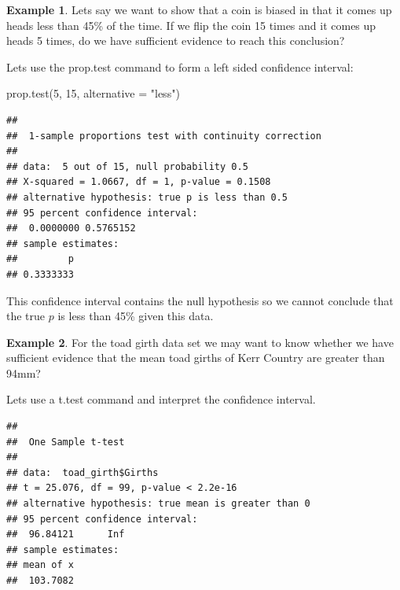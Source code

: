 \documentclass[
]{book}
\newenvironment{Shaded}{\begin{snugshade}}{\end{snugshade}}
\newcommand{\AttributeTok}[1]{\textcolor[rgb]{0.77,0.63,0.00}{#1}}
\newcommand{\DecValTok}[1]{\textcolor[rgb]{0.00,0.00,0.81}{#1}}
\newcommand{\FloatTok}[1]{\textcolor[rgb]{0.00,0.00,0.81}{#1}}
\newcommand{\FunctionTok}[1]{\textcolor[rgb]{0.00,0.00,0.00}{#1}}
\newcommand{\NormalTok}[1]{#1}
\newcommand{\SpecialCharTok}[1]{\textcolor[rgb]{0.00,0.00,0.00}{#1}}
\newcommand{\StringTok}[1]{\textcolor[rgb]{0.31,0.60,0.02}{#1}}
\theoremstyle{definition}
\theoremstyle{definition}
\newtheorem{example}{Example}[chapter]
\theoremstyle{definition}
\theoremstyle{definition}
\theoremstyle{remark}
\begin{document}
\begin{example}
\protect\hypertarget{exm:unnamed-chunk-579}{}\label{exm:unnamed-chunk-579}Lets say we want to show that a coin is biased in that it comes up heads less than 45\% of the time. If we flip the coin 15 times and it comes up heads 5 times, do we have sufficient evidence to reach this conclusion?
\end{example}

Lets use the prop.test command to form a left sided confidence interval:

\begin{Shaded}
\begin{Highlighting}[]
\FunctionTok{prop.test}\NormalTok{(}\DecValTok{5}\NormalTok{, }\DecValTok{15}\NormalTok{, }\AttributeTok{alternative =} \StringTok{"less"}\NormalTok{)}
\end{Highlighting}
\end{Shaded}

\begin{verbatim}
## 
##  1-sample proportions test with continuity correction
## 
## data:  5 out of 15, null probability 0.5
## X-squared = 1.0667, df = 1, p-value = 0.1508
## alternative hypothesis: true p is less than 0.5
## 95 percent confidence interval:
##  0.0000000 0.5765152
## sample estimates:
##         p 
## 0.3333333
\end{verbatim}

This confidence interval contains the null hypothesis so we cannot conclude that the true \(p\) is less than 45\% given this data.

\begin{example}
\protect\hypertarget{exm:unnamed-chunk-581}{}\label{exm:unnamed-chunk-581}For the toad girth data set we may want to know whether we have sufficient evidence that the mean toad girths of Kerr Country are greater than 94mm?
\end{example}

Lets use a t.test command and interpret the confidence interval.

\begin{Shaded}
\end{Shaded}

\begin{verbatim}
## 
##  One Sample t-test
## 
## data:  toad_girth$Girths
## t = 25.076, df = 99, p-value < 2.2e-16
## alternative hypothesis: true mean is greater than 0
## 95 percent confidence interval:
##  96.84121      Inf
## sample estimates:
## mean of x 
##  103.7082
\end{verbatim}
\end{document}
